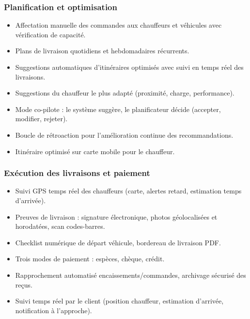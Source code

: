 \subsubsection{Planification et optimisation}
\begin{itemize}[leftmargin=2.5em]
    \item[$\bullet$] Affectation manuelle des commandes aux chauffeurs et véhicules avec vérification de capacité.
    \item[$\bullet$] Plans de livraison quotidiens et hebdomadaires récurrents.
    \item[$\bullet$] Suggestions automatiques d'itinéraires optimisés avec suivi en temps réel des livraisons.
    \item[$\bullet$] Suggestions du chauffeur le plus adapté (proximité, charge, performance).
    \item[$\bullet$] Mode co-pilote : le système suggère, le planificateur décide (accepter, modifier, rejeter).
    \item[$\bullet$] Boucle de rétroaction pour l'amélioration continue des recommandations.
    \item[$\bullet$] Itinéraire optimisé sur carte mobile pour le chauffeur.
\end{itemize}

\subsubsection{Exécution des livraisons et paiement}
\begin{itemize}[leftmargin=2.5em]
    \item[$\bullet$] Suivi GPS temps réel des chauffeurs (carte, alertes retard, estimation temps d'arrivée).
    \item[$\bullet$] Preuves de livraison : signature électronique, photos géolocalisées et horodatées, scan codes-barres.
    \item[$\bullet$] Checklist numérique de départ véhicule, bordereau de livraison PDF.
    \item[$\bullet$] Trois modes de paiement : espèces, chèque, crédit.
    \item[$\bullet$] Rapprochement automatisé encaissements/commandes, archivage sécurisé des reçus.
    \item[$\bullet$] Suivi temps réel par le client (position chauffeur, estimation d'arrivée, notification à l'approche).
\end{itemize}

